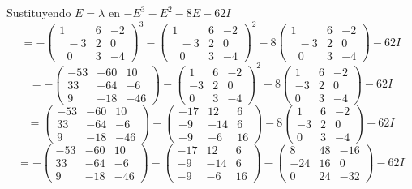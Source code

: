 \begin{itemize}
    Sustituyendo $E=\lambda$ en $-E^3-E^2-8E-62I$
    $$=-\begin{pmatrix}1&6&-2\\ \:\:\:-3&2&0\\ \:\:\:0&3&-4\end{pmatrix}^3-\begin{pmatrix}1&6&-2\\ \:\:\:-3&2&0\\ \:\:\:0&3&-4\end{pmatrix}^2-8\begin{pmatrix}1&6&-2\\ \:\:\:-3&2&0\\ \:\:\:0&3&-4\end{pmatrix}-62I$$
    $$=-\begin{pmatrix}-53&-60&10\\ 33&-64&-6\\ 9&-18&-46\end{pmatrix}-\begin{pmatrix}1&6&-2\\ -3&2&0\\ 0&3&-4\end{pmatrix}^2-8\begin{pmatrix}1&6&-2\\ -3&2&0\\ 0&3&-4\end{pmatrix}-62I$$
    $$=\begin{pmatrix}-53&-60&10\\ 33&-64&-6\\ 9&-18&-46\end{pmatrix}-\begin{pmatrix}-17&12&6\\ -9&-14&6\\ -9&-6&16\end{pmatrix}-8\begin{pmatrix}1&6&-2\\ -3&2&0\\ 0&3&-4\end{pmatrix}-62I$$
    $$=-\begin{pmatrix}-53&-60&10\\ 33&-64&-6\\ 9&-18&-46\end{pmatrix}-\begin{pmatrix}-17&12&6\\ -9&-14&6\\ -9&-6&16\end{pmatrix}-\begin{pmatrix}8&48&-16\\ -24&16&0\\ 0&24&-32\end{pmatrix}-62I$$

\end{itemize}
